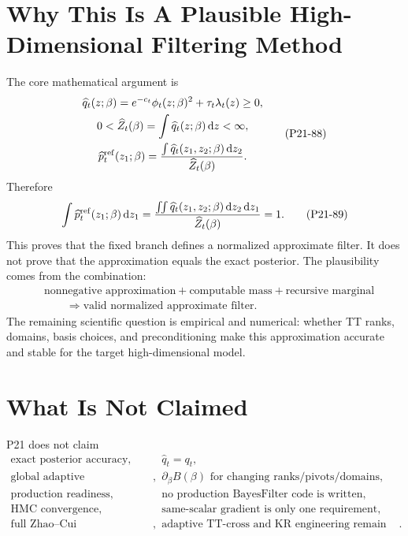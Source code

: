 \documentclass[11pt]{article}
\newcommand{\dd}{\,\mathrm d}
\newcommand{\widehatZ}{\widehat Z}
\newcommand{\widehatq}{\widehat q}
\newcommand{\widehatp}{\widehat p}
\begin{document}
\section{Why This Is A Plausible High-Dimensional Filtering Method}

The core mathematical argument is
\[
\begin{gathered}
    \widehatq_t(z;\beta)
    =
    e^{-c_t}\phi_t(z;\beta)^2+\tau_t\lambda_t(z)\ge0,\\
    0<\widehatZ_t(\beta)=\int\widehatq_t(z;\beta)\dd z<\infty,\\
    \widehatp_t^{\rm ref}(z_1;\beta)
    =
    \frac{\int\widehatq_t(z_1,z_2;\beta)\dd z_2}{\widehatZ_t(\beta)}.
\end{gathered}
\tag{P21-88}
\]
Therefore
\[
    \int\widehatp_t^{\rm ref}(z_1;\beta)\dd z_1
    =
    \frac{\int\!\!\int\widehatq_t(z_1,z_2;\beta)\dd z_2\dd z_1}
    {\widehatZ_t(\beta)}
    =
    1.
    \tag{P21-89}
\]
This proves that the fixed branch defines a normalized approximate filter.
It does not prove that the approximation equals the exact posterior.  The
plausibility comes from the combination:
\[
\begin{aligned}
    &\text{nonnegative approximation}
    +\text{computable mass}
    +\text{recursive marginal}\\
    &\qquad\Longrightarrow
    \text{valid normalized approximate filter}.
\end{aligned}
    \tag{P21-90}
\]
The remaining scientific question is empirical and numerical: whether TT ranks,
domains, basis choices, and preconditioning make this approximation accurate
and stable for the target high-dimensional model.

\section{What Is Not Claimed}

P21 does not claim
\[
\begin{array}{ll}
\text{exact posterior accuracy}, & \widehatq_t=q_t,\\
\text{global adaptive differentiability}, & \partial_\beta B(\beta)
    \text{ for changing ranks/pivots/domains},\\
\text{production readiness}, & \text{no production BayesFilter code is written},\\
\text{HMC convergence}, & \text{same-scalar gradient is only one requirement},\\
\text{full Zhao--Cui implementation}, & \text{adaptive TT-cross and KR engineering remain gaps}.
\end{array}
\tag{P21-91}
\]
\end{document}

